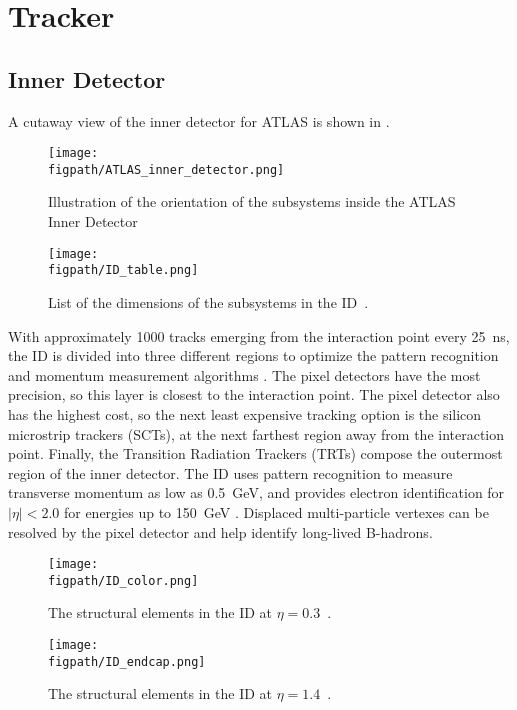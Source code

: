 \section{Tracker}

\subsection{Inner Detector}
\label{inner_detector}

A cutaway view of the inner detector for ATLAS is shown in .
\begin{figure}[h!tbp]
\centering
\texttt{[image: \\figpath/ATLAS\_inner\_detector.png]}
\caption{Illustration of the orientation of the subsystems inside the ATLAS Inner Detector~\cite{Aad:2008Jinst}}
\label{ATLAS-InnerDetector}
\end{figure}

\begin{figure}[h!tbp]
\centering
\texttt{[image: \\figpath/ID\_table.png]}
\caption{List of the dimensions of the subsystems in the ID~\cite{ATLAS_long}.}
\label{ID-table}
\end{figure}
With approximately 1000 tracks emerging from the interaction point every 25~ns, the ID is divided into three different regions to optimize the pattern recognition and momentum measurement algorithms \cite{ATLAS_long}.  
The pixel detectors have the most precision, so this layer is closest to the interaction point. The pixel detector also has the highest cost, so the next least expensive tracking option is the silicon microstrip trackers (SCTs), at the next farthest region away from the interaction point.  Finally, the Transition Radiation Trackers (TRTs) compose the outermost region of the inner detector.
The ID uses pattern recognition to measure transverse momentum as low as 0.5~GeV, and provides electron identification for $|\eta| < 2.0$ for energies up to 150~GeV \cite{ATLAS_long}. Displaced multi-particle vertexes can be resolved by the pixel detector and help identify long-lived B-hadrons.

\begin{figure}[h!tbp]
\centering
\texttt{[image: \\figpath/ID\_color.png]}
\caption{The structural elements in the ID at $\eta = 0.3$~\cite{ATLAS_long}.}
\label{ID_color}
\end{figure}

\begin{figure}[h!tbp]
\centering
\texttt{[image: \\figpath/ID\_endcap.png]}
\caption{The structural elements in the ID at $\eta = 1.4$~\cite{ATLAS_long}.}
\label{ID_endcap}
\end{figure}

